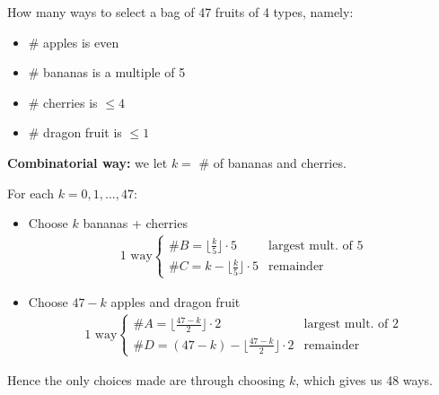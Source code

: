 \documentclass[12pt]{article}
\begin{document}
\eg How many ways to select a bag of 47 fruits of 4 types, namely: \begin{itemize}
    \item \# apples is even
    \item \# bananas is a multiple of 5
    \item \# cherries is $\leq 4$
    \item \# dragon fruit is $\leq 1$
\end{itemize}

\textbf{Combinatorial way:} we let $k=$ \# of bananas and cherries.

For each $k=0,1,\dots,47$:\begin{itemize}
    \item Choose $k$ bananas + cherries \begin{align*}
       1 \text{ way}\begin{cases}
        \#B = \lfloor\frac{k}{5}\rfloor \cdot 5 &\text{largest mult. of 5}\\
        \#C=k-\lfloor\frac{k}{5}\rfloor \cdot 5 &\text{remainder}
       \end{cases}
    \end{align*}
    \item Choose $47-k$ apples and dragon fruit\begin{align*}
        1 \text{ way}\begin{cases}
         \#A = \lfloor\frac{47-k}{2}\rfloor \cdot 2 &\text{largest mult. of 2}\\
         \#D=(47-k)-\lfloor\frac{47-k}{2}\rfloor \cdot 2 &\text{remainder}
        \end{cases}
     \end{align*}
\end{itemize}
Hence the only choices made are through choosing $k$, which gives us 48 ways.
\end{document}
